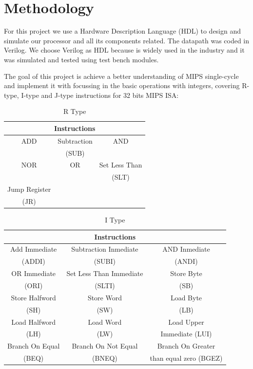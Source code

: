 \documentclass[conference]{IEEEtran}
\begin{document}
\section{Methodology}	%

For this project we use a Hardware Description Language (HDL) to design and simulate our
processor and all its components related. The datapath was coded in Verilog. We choose Verilog \cite{b2} as HDL because is widely used in the industry and it was simulated and tested using test bench modules.

The goal of this project is achieve a better understanding of MIPS single-cycle and implement it with focussing in the basic operations with integers, covering R-type, I-type and J-type instructions for 32 bits MIPS ISA:

\begin{table}[htbp]
\caption{R Type} %
\begin{center}
\begin{tabular}{|c|c|c|}
\hline
\multicolumn{3}{|c|}{\textbf{Instructions}} \\
\hline
ADD&Subtraction&AND  \\
&(SUB)&\\
\hline
NOR&OR&Set Less Than\\
&&(SLT)\\
\hline
Jump Register&& \\
(JR)&&\\
\hline
\end{tabular}
\label{tab_rtype}
\end{center}
\end{table}

\begin{table}[htbp]
\caption{I Type} %
\begin{center}
\begin{tabular}{|c|c|c|}
\hline
\multicolumn{3}{|c|}{\textbf{Instructions}} \\
\hline
Add Immediate&Subtraction Inmediate & AND Inmediate \\
(ADDI) &(SUBI) & (ANDI) \\
\hline
OR Immediate&Set Less Than Immediate&  Store Byte \\
(ORI)&(SLTI)&(SB) \\
\hline
Store Halfword&Store Word&Load Byte \\
(SH)&(SW)&(LB)\\
\hline
Load Halfword&Load Word&Load Upper\\
(LH)&(LW)&Immediate (LUI)\\
\hline
Branch On Equal&Branch On Not Equal&Branch On Greater \\
(BEQ)&(BNEQ)&than equal zero (BGEZ)  \\
\hline
\end{tabular}
\label{tab_itype}
\end{center}
\end{table}
\end{document}

